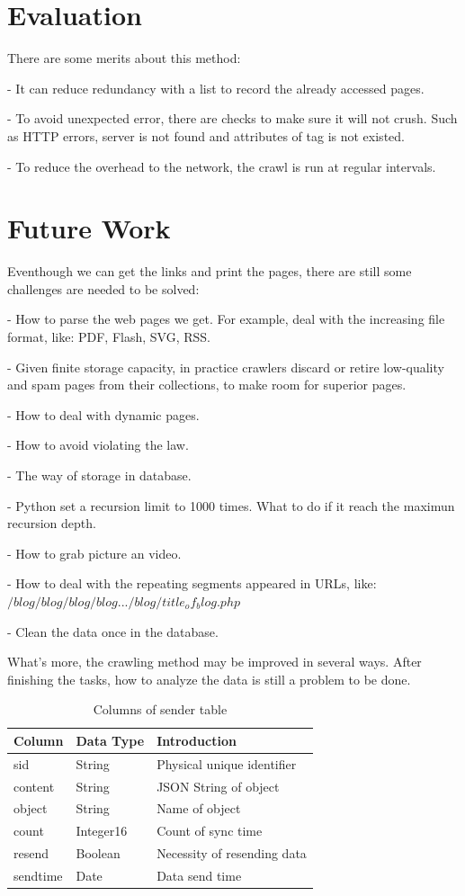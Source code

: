 \documentclass[twocolumn,10pt]{article}
\begin{document}
\section{Evaluation}
There are some merits about this method:\par
- It can reduce redundancy with a list to record the already accessed pages.\par
- To avoid unexpected error, there are checks to make sure it will not crush. Such as HTTP errors, server is not found and attributes of tag is not existed.\par
- To reduce the overhead to the network, the crawl is run at regular intervals.\par
\section{Future Work}
Eventhough we can get the links and print the pages,
there are still some challenges are needed to be solved:\par
- How to parse the web pages we get. For example, deal with the increasing file format, like: PDF, Flash, SVG, RSS.\par
- Given finite storage capacity, in practice crawlers discard or retire low-quality and spam pages from their collections, to make room for superior pages.\par
- How to deal with dynamic pages.\par
- How to avoid violating the law.\par
- The way of storage in database.\par
- Python set a recursion limit to 1000 times. What to do if it reach the maximun recursion depth.\par
- How to grab picture an video.\par
- How to deal with the repeating segments appeared in URLs, like:$/blog/blog/blog/blog.../blog/title_of_blog.php$\par
- Clean the data once in the database.\par
What's more, the crawling method may be improved in several ways. After finishing the tasks, how to analyze the data is still a problem to be done.

\begin{table}[tbp]
	\centering  
	\begin{tabular}{lll}  
		\hline
		Column &Data Type & Introduction\\ 
		\hline  
		sid &String & Physical unique identifier\\
		content & String & JSON String of object\\ 
		object & String & Name of object\\
		count & Integer16 & Count of sync time\\
		resend & Boolean &Necessity of resending data \\
		sendtime & Date & Data send time\\
		\hline
	\end{tabular}
	\caption{Columns of sender table}
\end{table}


{
	\footnotesize
	
}
\end{document}
